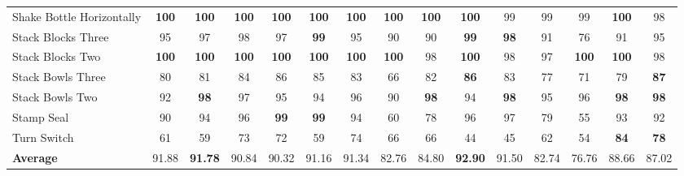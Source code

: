 \begin{table}[t]
{\begin{tabular}{lcc|cc|cc|cc|cc|cc|cc}
Shake Bottle Horizontally & \textbf{100} & \textbf{100} & \textbf{100} & \textbf{100} & \textbf{100} & \textbf{100} & \textbf{100} & \textbf{100} & \textbf{100} & 99 & 99 & 99 & \textbf{100} & 98 \\
Stack Blocks Three & 95 & 97 & 98 & 97 & \textbf{99} & 95 & 90 & 90 & \textbf{99} & \textbf{98} & 91 & 76 & 91 & 95 \\
Stack Blocks Two & \textbf{100} & \textbf{100} & \textbf{100} & \textbf{100} & \textbf{100} & \textbf{100} & \textbf{100} & 98 & \textbf{100} & 98 & 97 & \textbf{100} & \textbf{100} & 98 \\
Stack Bowls Three & 80 & 81 & 84 & 86 & 85 & 83 & 66 & 82 & \textbf{86} & 83 & 77 & 71 & 79 & \textbf{87} \\
Stack Bowls Two & 92 & \textbf{98} & 97 & 95 & 94 & 96 & 90 & \textbf{98} & 94 & \textbf{98} & 95 & 96 & \textbf{98} & \textbf{98} \\
Stamp Seal & 90 & 94 & 96 & \textbf{99} & \textbf{99} & 94 & 60 & 78 & 96 & 97 & 79 & 55 & 93 & 92 \\
Turn Switch & 61 & 59 & 73 & 72 & 59 & 74 & 66 & 66 & 44 & 45 & 62 & 54 & \textbf{84} & \textbf{78} \\
\midrule
\textbf{Average} & 91.88 & \textbf{91.78} & 90.84 & 90.32 & 91.16 & 91.34 & 82.76 & 84.80 & \textbf{92.90} & 91.50 & 82.74 & 76.76 & 88.66 & 87.02 \\
\bottomrule
\end{tabular}
}
\end{table}
